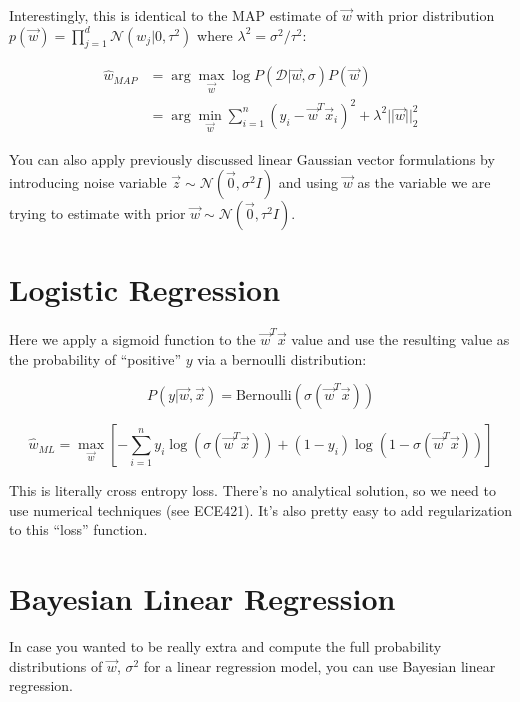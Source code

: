 \documentclass[a4paper,12pt]{report}
\begin{document}
Interestingly, this is identical to the MAP estimate of $\vec w$ with prior distribution $p(\vec w) = \prod_{j=1}^d \mathcal N(w_j | 0, \tau^2)$ where $\lambda^2 = \sigma^2/\tau^2$:

\begin{equation}
\begin{split}
\hat w_{MAP} &= \arg\max_{\vec w} \log P(\mathcal D | \vec w, \sigma)P(\vec w) \\
&= \arg\min_{\vec w} \sum_{i=1}^{n} (y_i - \vec w^T \vec x_i)^2 + \lambda^2 ||\vec w||_2^2
\end{split}
\end{equation}


You can also apply previously discussed linear Gaussian vector formulations by introducing noise variable $\vec z \sim \mathcal N(\vec 0, \sigma^2 I)$ and using $\vec w$ as the variable we are trying to estimate with prior $\vec w \sim \mathcal N (\vec 0, \tau^2 I)$. 

\section{Logistic Regression}

Here we apply a sigmoid function to the $\vec w^T \vec x$ value and use the resulting value as the probability of ``positive'' $y$ via a bernoulli distribution:

\begin{equation}
P(y | \vec w, \vec x) = \text{Bernoulli}(\sigma(\vec w^T \vec x))
\end{equation}

\begin{equation}
\hat w_{ML} = \max_{\vec w}[-\sum_{i=1}^{n} y_i\log(\sigma(\vec w^T\vec x)) + (1-y_i) \log(1-\sigma(\vec w^T \vec x))  ]
\end{equation}

This is literally cross entropy loss. There's no analytical solution, so we need to use numerical techniques (see ECE421). It's also pretty easy to add regularization to this ``loss'' function.

\section{Bayesian Linear Regression}

In case you wanted to be really extra and compute the full probability distributions of $\vec w$, $\sigma^2$ for a linear regression model, you can use Bayesian linear regression.
\end{document}
